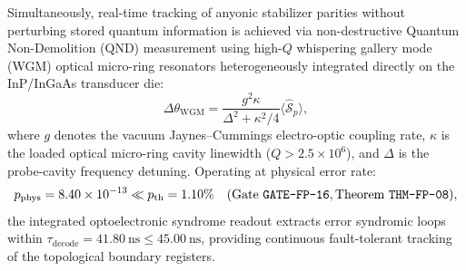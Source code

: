 \documentclass[11pt,onecolumn]{article}
\begin{document}
Simultaneously, real-time tracking of anyonic stabilizer parities without perturbing stored quantum information is achieved via non-destructive Quantum Non-Demolition (QND) measurement using high-$Q$ whispering gallery mode (WGM) optical micro-ring resonators heterogeneously integrated directly on the InP/InGaAs transducer die:
\begin{equation}
\Delta\theta_{\mathrm{WGM}} = \frac{g^2 \kappa}{\Delta^2 + \kappa^2/4} \langle \hat{\mathcal{S}}_p \rangle,
\label{eq:tqec_wgm}
\end{equation}
where $g$ denotes the vacuum Jaynes--Cummings electro-optic coupling rate, $\kappa$ is the loaded optical micro-ring cavity linewidth ($Q > 2.5\times 10^6$), and $\Delta$ is the probe-cavity frequency detuning. Operating at physical error rate:
\begin{equation}
p_{\mathrm{phys}} = 8.40\times 10^{-13} \ll p_{\text{th}} = 1.10\% \quad (\text{Gate \texttt{GATE-FP-16}}, \text{Theorem \texttt{THM-FP-08}}),
\label{eq:tqec_threshold}
\end{equation}
the integrated optoelectronic syndrome readout extracts error syndromic loops within $\tau_{\mathrm{decode}} = 41.80~\mathrm{ns} \le 45.00~\mathrm{ns}$, providing continuous fault-tolerant tracking of the topological boundary registers.

\FloatBarrier
\end{document}
